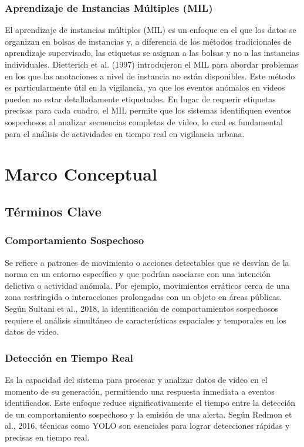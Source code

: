 \documentclass[listof=nochaptergap,12pt,times,authoryear]{report}
\begin{document}
\subsection{Aprendizaje de Instancias Múltiples (MIL)}
El aprendizaje de instancias múltiples (MIL) es un enfoque en el que los datos se organizan en bolsas de instancias y, a diferencia de los métodos tradicionales de aprendizaje supervisado, las etiquetas se asignan a las bolsas y no a las instancias individuales. Dietterich et al. (1997) introdujeron el MIL para abordar problemas en los que las anotaciones a nivel de instancia no están disponibles. Este método es particularmente útil en la vigilancia, ya que los eventos anómalos en videos pueden no estar detalladamente etiquetados. En lugar de requerir etiquetas precisas para cada cuadro, el MIL permite que los sistemas identifiquen eventos sospechosos al analizar secuencias completas de video, lo cual es fundamental para el análisis de actividades en tiempo real en vigilancia urbana.

\chapter{Marco Conceptual}

\section{Términos Clave}

\subsection{Comportamiento Sospechoso}
Se refiere a patrones de movimiento o acciones detectables que se desvían de la norma en un entorno específico y que podrían asociarse con una intención delictiva o actividad anómala. Por ejemplo, movimientos erráticos cerca de una zona restringida o interacciones prolongadas con un objeto en áreas públicas. Según Sultani et al., 2018, la identificación de comportamientos sospechosos requiere el análisis simultáneo de características espaciales y temporales en los datos de video.

\subsection{Detección en Tiempo Real}
Es la capacidad del sistema para procesar y analizar datos de video en el momento de su generación, permitiendo una respuesta inmediata a eventos identificados. Este enfoque reduce significativamente el tiempo entre la detección de un comportamiento sospechoso y la emisión de una alerta. Según Redmon et al., 2016, técnicas como YOLO son esenciales para lograr detecciones rápidas y precisas en tiempo real.
\end{document}
